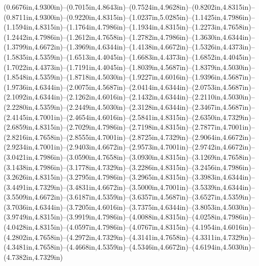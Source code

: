 (0.6676in,4.9300in)--(0.7015in,4.8643in)--(0.7524in,4.9628in)--(0.8202in,4.8315in)--(0.8711in,4.9300in)--(0.9220in,4.8315in)--(1.0237in,5.0285in)--(1.1425in,4.7986in)--(1.1594in,4.8315in)--(1.1764in,4.7986in)--(1.1934in,4.8315in)--(1.2273in,4.7658in)--(1.2442in,4.7986in)--(1.2612in,4.7658in)--(1.2782in,4.7986in)--(1.3630in,4.6344in)--(1.3799in,4.6672in)--(1.3969in,4.6344in)--(1.4138in,4.6672in)--(1.5326in,4.4373in)--(1.5835in,4.5359in)--(1.6513in,4.4045in)--(1.6683in,4.4373in)--(1.6852in,4.4045in)--(1.7022in,4.4373in)--(1.7191in,4.4045in)--(1.8039in,4.5687in)--(1.8379in,4.5030in)--(1.8548in,4.5359in)--(1.8718in,4.5030in)--(1.9227in,4.6016in)--(1.9396in,4.5687in)--(1.9736in,4.6344in)--(2.0075in,4.5687in)--(2.0414in,4.6344in)--(2.0753in,4.5687in)--(2.1092in,4.6344in)--(2.1262in,4.6016in)--(2.1432in,4.6344in)--(2.2110in,4.5030in)--(2.2280in,4.5359in)--(2.2449in,4.5030in)--(2.3128in,4.6344in)--(2.3467in,4.5687in)--(2.4145in,4.7001in)--(2.4654in,4.6016in)--(2.5841in,4.8315in)--(2.6350in,4.7329in)--(2.6859in,4.8315in)--(2.7029in,4.7986in)--(2.7198in,4.8315in)--(2.7877in,4.7001in)--(2.8216in,4.7658in)--(2.8555in,4.7001in)--(2.8725in,4.7329in)--(2.9064in,4.6672in)--(2.9234in,4.7001in)--(2.9403in,4.6672in)--(2.9573in,4.7001in)--(2.9742in,4.6672in)--(3.0421in,4.7986in)--(3.0590in,4.7658in)--(3.0930in,4.8315in)--(3.1269in,4.7658in)--(3.1438in,4.7986in)--(3.1778in,4.7329in)--(3.2286in,4.8315in)--(3.2456in,4.7986in)--(3.2626in,4.8315in)--(3.2795in,4.7986in)--(3.2965in,4.8315in)--(3.3983in,4.6344in)--(3.4491in,4.7329in)--(3.4831in,4.6672in)--(3.5000in,4.7001in)--(3.5339in,4.6344in)--(3.5509in,4.6672in)--(3.6187in,4.5359in)--(3.6357in,4.5687in)--(3.6527in,4.5359in)--(3.7036in,4.6344in)--(3.7205in,4.6016in)--(3.7375in,4.6344in)--(3.8053in,4.5030in)--(3.9749in,4.8315in)--(3.9919in,4.7986in)--(4.0088in,4.8315in)--(4.0258in,4.7986in)--(4.0428in,4.8315in)--(4.0597in,4.7986in)--(4.0767in,4.8315in)--(4.1954in,4.6016in)--(4.2802in,4.7658in)--(4.2972in,4.7329in)--(4.3141in,4.7658in)--(4.3311in,4.7329in)--(4.3481in,4.7658in)--(4.4668in,4.5359in)--(4.5346in,4.6672in)--(4.6194in,4.5030in)--(4.7382in,4.7329in) 